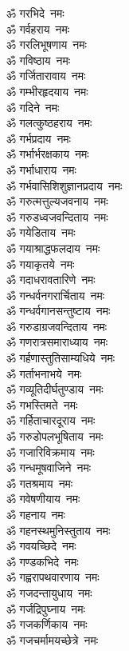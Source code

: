 \begin{flushleft}
\begin{multicols}{2}
ॐ गरभिदे~नमः\\
ॐ गर्वहराय~नमः\\
ॐ गरलिभूषणाय~नमः\\
ॐ गविष्ठाय~नमः\\
ॐ गर्जितारावाय~नमः\\
ॐ गम्भीरहृदयाय~नमः\\
ॐ गदिने~नमः\\
ॐ गलत्कुष्ठहराय~नमः\\
ॐ गर्भप्रदाय~नमः\\
ॐ गर्भार्भरक्षकाय~नमः\hfill{}\\
ॐ गर्भाधाराय~नमः\\
ॐ गर्भवासिशिशुज्ञानप्रदाय~नमः\\
ॐ गरुत्मत्तुल्यजवनाय~नमः\\
ॐ गरुडध्वजवन्दिताय~नमः\\
ॐ गयेडिताय~नमः\\
ॐ गयाश्राद्धफलदाय~नमः\\
ॐ गयाकृतये~नमः\\
ॐ गदाधरावतारिणे~नमः\\
ॐ गन्धर्वनगरार्चिताय~नमः\\
ॐ गन्धर्वगानसन्तुष्टाय~नमः\hfill{}\\
ॐ गरुडाग्रजवन्दिताय~नमः\\
ॐ गणरात्रसमाराध्याय~नमः\\
ॐ गर्हणास्तुतिसाम्यधिये~नमः\\
ॐ गर्ताभनाभये~नमः\\
ॐ गव्यूतिदीर्घतुण्डाय~नमः\\
ॐ गभस्तिमते~नमः\\
ॐ गर्हिताचारदूराय~नमः\\
ॐ गरुडोपलभूषिताय~नमः\\
ॐ गजारिविक्रमाय~नमः\\
ॐ गन्धमूषवाजिने~नमः\hfill{}\\
ॐ गतश्रमाय~नमः\\
ॐ गवेषणीयाय~नमः\\
ॐ गहनाय~नमः\\
ॐ गहनस्थमुनिस्तुताय~नमः\\
ॐ गवयच्छिदे~नमः\\
ॐ गण्डकभिदे~नमः\\
ॐ गह्वरापथवारणाय~नमः\\
ॐ गजदन्तायुधाय~नमः\\
ॐ गर्जद्रिपुघ्नाय~नमः\\
ॐ गजकर्णिकाय~नमः\hfill{}\\
ॐ गजचर्मामयच्छेत्रे~नमः\\

\end{multicols}
\end{flushleft}
